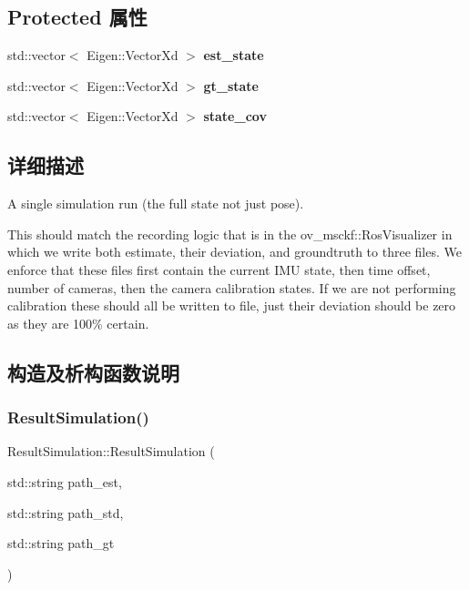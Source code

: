 \subsection*{Protected 属性}
\begin{DoxyCompactItemize}
\item 
\mbox{\label{classov__eval_1_1ResultSimulation_abba7015a0c17ea62bab2e67599fe928d}} 
std\+::vector$<$ Eigen\+::\+Vector\+Xd $>$ {\bfseries est\+\_\+state}
\item 
\mbox{\label{classov__eval_1_1ResultSimulation_a27c5a2ab21bb80022d2da1ae10886253}} 
std\+::vector$<$ Eigen\+::\+Vector\+Xd $>$ {\bfseries gt\+\_\+state}
\item 
\mbox{\label{classov__eval_1_1ResultSimulation_a41f5acf9da9823cc67c3870334f659d2}} 
std\+::vector$<$ Eigen\+::\+Vector\+Xd $>$ {\bfseries state\+\_\+cov}
\end{DoxyCompactItemize}


\subsection{详细描述}
A single simulation run (the full state not just pose). 

This should match the recording logic that is in the ov\+\_\+msckf\+::\+Ros\+Visualizer in which we write both estimate, their deviation, and groundtruth to three files. We enforce that these files first contain the current I\+MU state, then time offset, number of cameras, then the camera calibration states. If we are not performing calibration these should all be written to file, just their deviation should be zero as they are 100\% certain. 

\subsection{构造及析构函数说明}
\mbox{\label{classov__eval_1_1ResultSimulation_ad75bc6dc74af33a2ecdf0c8eca44ecca}} 
\subsubsection{\texorpdfstring{Result\+Simulation()}{ResultSimulation()}}
{\footnotesize\ttfamily Result\+Simulation\+::\+Result\+Simulation (\begin{DoxyParamCaption}\item[{std\+::string}]{path\+\_\+est,  }\item[{std\+::string}]{path\+\_\+std,  }\item[{std\+::string}]{path\+\_\+gt }\end{DoxyParamCaption})}



